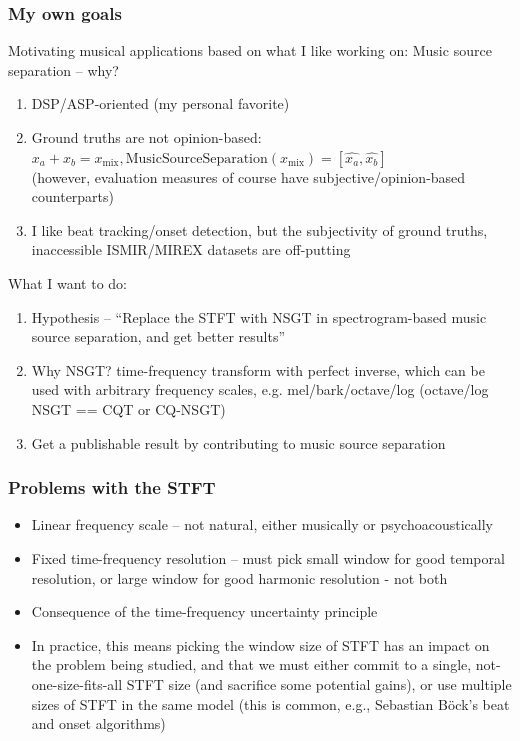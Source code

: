\documentclass[usenames,dvipsnames]{beamer}
\title{\ThesisTitle}
\subtitle{MA Thesis research proposal}
\author{Sevag Hanssian}
\institute{DDMAL, McGill}
\begin{document}
\begin{frame}
\maketitle
\end{frame}

\begin{frame}
	\frametitle{My own goals}
	Motivating musical applications based on what I like working on: Music source separation -- why?
	\begin{enumerate}
		\item
			DSP/ASP-oriented (my personal favorite)
		\item
			Ground truths are not opinion-based:\\
			$x_{a} + x_{b} = x_{\text{mix}}, \text{MusicSourceSeparation}(x_{\text{mix}}) = [\hat{x_{a}}, \hat{x_{b}}]$\\
			(however, evaluation measures of course have subjective/opinion-based counterparts)
		\item
			I like beat tracking/onset detection, but the subjectivity of ground truths, inaccessible ISMIR/MIREX datasets are off-putting
	\end{enumerate}
	What I want to do:
	\begin{enumerate}
		\item
			Hypothesis -- ``Replace the STFT with NSGT in spectrogram-based music source separation, and get better results''
		\item
			Why NSGT? time-frequency transform with perfect inverse, which can be used with arbitrary frequency scales, e.g. mel/bark/octave/log (octave/log NSGT == CQT or CQ-NSGT)
		\item
			Get a publishable result by contributing to music source separation
	\end{enumerate}
\end{frame}

\begin{frame}
	\frametitle{Problems with the STFT}
	\begin{itemize}
		\item
			Linear frequency scale -- not natural, either musically or psychoacoustically
		\item
			Fixed time-frequency resolution -- must pick small window for good temporal resolution, or large window for good harmonic resolution - not both
		\item
			Consequence of the time-frequency uncertainty principle
		\item
			In practice, this means picking the window size of STFT has an impact on the problem being studied, and that we must either commit to a single, not-one-size-fits-all STFT size (and sacrifice some potential gains), or use multiple sizes of STFT in the same model (this is common, e.g., Sebastian B{\"o}ck's beat and onset algorithms)
	\end{itemize}
\end{frame}
\end{document}
